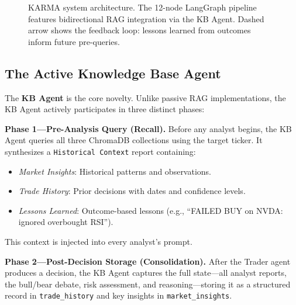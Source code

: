 \documentclass[conference]{IEEEtran}
\begin{document}
\begin{figure}[htbp]
\caption{KARMA system architecture. The 12-node LangGraph pipeline features bidirectional RAG integration via the KB Agent. Dashed arrow shows the feedback loop: lessons learned from outcomes inform future pre-queries.}
\label{fig:architecture}
\end{figure}

\subsection{The Active Knowledge Base Agent}

The \textbf{KB Agent} is the core novelty. Unlike passive RAG implementations, the KB Agent actively participates in three distinct phases:

\textbf{Phase 1---Pre-Analysis Query (Recall).} Before any analyst begins, the KB Agent queries all three ChromaDB collections using the target ticker. It synthesizes a \texttt{Historical Context} report containing:
\begin{itemize}
\item \textit{Market Insights}: Historical patterns and observations.
\item \textit{Trade History}: Prior decisions with dates and confidence levels.
\item \textit{Lessons Learned}: Outcome-based lessons (e.g., ``FAILED BUY on NVDA: ignored overbought RSI'').
\end{itemize}
This context is injected into every analyst's prompt.

\textbf{Phase 2---Post-Decision Storage (Consolidation).} After the Trader agent produces a decision, the KB Agent captures the full state---all analyst reports, the bull/bear debate, risk assessment, and reasoning---storing it as a structured record in \texttt{trade\_history} and key insights in \texttt{market\_insights}.
\end{document}
